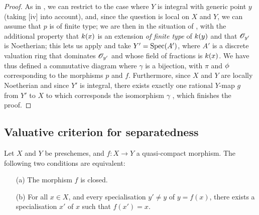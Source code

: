 \begin{proof}
As in , we can restrict to the case where $Y$ is integral with generic point $y$ (taking [iv] into account), and, since the question is local on $X$ and $Y$, we can assume that $p$ is of finite type;
we are then in the situation of , with the additional property that $k(x)$ is an extension \emph{of finite type} of $k(y)$  and that $\mathscr{O}_{y'}$ is Noetherian;
this lets us apply  and take $Y'=\operatorname{Spec}(A')$, where $A'$ is a discrete valuation ring that dominates $\mathscr{O}_{y'}$ and whose field of fractions is $k(x)$.
We have thus defined a commutative diagram  where $\gamma$ is a bijection, with $\pi$ and $\phi$ corresponding to the morphisms $p$ and $f$.
Furthermore, since $X$ and $Y$ are locally Noetherian  and since $Y'$ is integral, there exists exactly one rational $Y$-map $g$ from $Y'$ to $X$ to which corresponds the isomorphism $\gamma$ , which finishes the proof.
\end{proof}

\subsection{Valuative criterion for separatedness}
\label{subsection:II.7.2}

\begin{proposition}[7.2.1]
\label{II.7.2.1}
Let $X$ and $Y$ be preschemes, and $f:X\to Y$ a quasi-compact morphism.
The following two conditions are equivalent:
\begin{enumerate}
    \item[\rm{(a)}] The morphism $f$ is closed.
    \item[\rm{(b)}] For all $x\in X$, and every specialisation $y'\neq y$ of $y=f(x)$, there exists a specialisation $x'$ of $x$ such that $f(x')=x$.
\end{enumerate}
\end{proposition}


